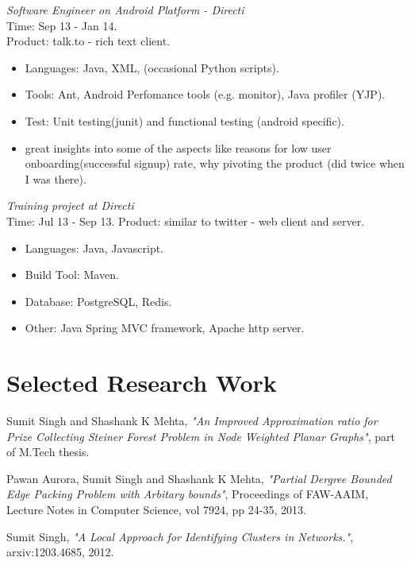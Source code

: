 \documentclass[margin,line]{resume}
\begin{document}
\begin{resume}
\textit{Software Engineer on Android Platform - Directi} \\
Time: Sep 13 - Jan 14.\\
Product: talk.to - rich text client.\\
\begin{itemize}
\item Languages: Java, XML, (occasional Python scripts).
\item Tools: Ant, Android Perfomance tools (e.g. monitor), Java profiler (YJP).
\item Test: Unit testing(junit) and functional testing (android specific).
\item great insights into some of the aspects like reasons for low user onboarding(successful signup) rate, why pivoting the product (did twice when I was there).
\end{itemize}

\textit{Training project at Directi}\\
Time: Jul 13 - Sep 13.
Product: similar to twitter - web client and server.\\
 \begin{itemize}
\item Languages: Java, Javascript.
\item Build Tool: Maven.
\item Database: PostgreSQL, Redis.
\item Other: Java Spring MVC framework, Apache http server.  
 \end{itemize}



    \section{\mysidestyle Selected Research Work}
\vspace{-2mm}
Sumit Singh and Shashank K Mehta, \textit{ "An Improved Approximation ratio for Prize Collecting Steiner Forest Problem in Node Weighted Planar Graphs"}, part of M.Tech thesis.

\vspace{-2mm}
Pawan Aurora, Sumit Singh and Shashank K Mehta, \textit{"Partial Dergree Bounded Edge Packing Problem with Arbitary bounds"}, Proceedings of FAW-AAIM, Lecture Notes in Computer Science, vol 7924, pp 24-35, 2013. 

\vspace{-2mm}
Sumit Singh, \textit{"A Local Approach for Identifying Clusters in Networks."}, arxiv:1203.4685, 2012.


\end{resume}
\end{document}
